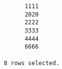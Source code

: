 \documentclass[11pt]{report}
\begin{document}
\begin{itemize}
\begin{verbatim}
      1111                                                                                                                                                                                                                                                                                                                                                                                                                                                                                                          
      2020                                                                                                                                                                                                                                                                                                                                                                                                                                                                                                          
      2222                                                                                                                                                                                                                                                                                                                                                                                                                                                                                                          
      3333                                                                                                                                                                                                                                                                                                                                                                                                                                                                                                          
      4444                                                                                                                                                                                                                                                                                                                                                                                                                                                                                                          
      6666                                                                                                                                                                                                                                                                                                                                                                                                                                                                                                          

8 rows selected.
  \end{verbatim}
\end{itemize}
\end{document}
